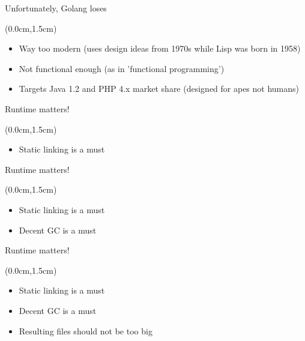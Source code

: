 \documentclass[xetex,14pt,aspectratio=169]{beamer}
\begin{document}
\begin{frame}{Unfortunately, Golang loses}
\begin{textblock*}{\framewidth-0.8cm}(0.0cm,1.5cm) %
\begin{itemize}
  \item Way too modern (uses design ideas from 1970s while Lisp was born in 1958)
  \item Not functional enough (as in 'functional programming')
  \item Targets Java 1.2 and PHP 4.x market share (designed for apes not humans)
\end{itemize}
\end{textblock*}
\end{frame}

\begin{frame}{Runtime matters!}
\begin{textblock*}{\framewidth-0.8cm}(0.0cm,1.5cm) %
\begin{itemize}
  \item Static linking is a must
\end{itemize}
\end{textblock*}
\end{frame}

\begin{frame}{Runtime matters!}
\begin{textblock*}{\framewidth-0.8cm}(0.0cm,1.5cm) %
\begin{itemize}
  \item Static linking is a must
  \item Decent GC is a must
\end{itemize}
\end{textblock*}
\end{frame}

\begin{frame}{Runtime matters!}
\begin{textblock*}{\framewidth-0.8cm}(0.0cm,1.5cm) %
\begin{itemize}
  \item Static linking is a must
  \item Decent GC is a must
  \item Resulting files should not be too big
\end{itemize}
\end{textblock*}
\end{frame}
\end{document}
